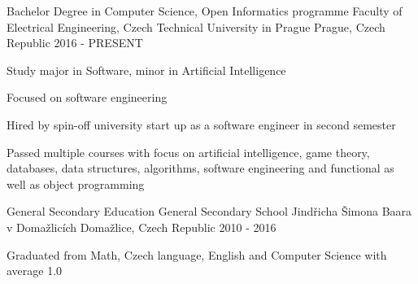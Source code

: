 


\begin{cventries}
	\cventry
	{Bachelor Degree in Computer Science, Open Informatics programme} %
	{Faculty of Electrical Engineering, Czech Technical University in Prague} %
	{Prague, Czech Republic} %
	{2016 - PRESENT} %
	{ %
		\begin{cvitems}
			\item {Study major in Software, minor in Artificial Intelligence}
			\item {Focused on software engineering}
			\item {Hired by spin-off university start up as a software engineer in second semester}
			\item {Passed multiple courses with focus on artificial intelligence, game theory, databases,
			 data structures, algorithms, software engineering and functional as well as object programming}
		\end{cvitems}
	}
		
		
	\cventry
	{General Secondary Education} %
	{General Secondary School Jindřicha Šimona Baara v Domažlicích} %
	{Domažlice, Czech Republic} %
	{2010 - 2016} %
	{ %
		\begin{cvitems}
			\item {Graduated from Math, Czech language, English and Computer Science with average 1.0}
		\end{cvitems}
	}
	
\end{cventries}